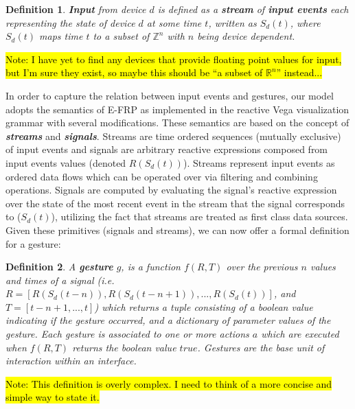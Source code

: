 \documentclass{article}
\newcommand{\Z}{\mathbb{Z}}
\newcommand{\R}{\mathbb{R}}
\newtheorem{define}{Definition}
\begin{document}
\begin{define}
\textbf{Input} from device $d$ is defined as a \textbf{stream} of \textbf{input events} each representing the state of device $d$ at some time $t$, written as $S_d(t)$, where $S_d(t)$ maps time $t$ to a subset of $\Z^n$ with $n$ being device dependent.
\end{define}

\hl{Note: I have yet to find any devices that provide floating point values for input, but I'm sure they exist, so maybe this should be ``a subset of $\R^n$'' instead...}

In order to capture the relation between input events and gestures, our model adopts the semantics of E-FRP as implemented in the reactive Vega visualization grammar \cite{satyanarayan2014declarative} with several modifications. These semantics are based on the concept of \textbf{\textit{streams}} and \textbf{\textit{signals}}. Streams are time ordered sequences (mutually exclusive) of input events and signals are arbitrary reactive expressions composed from input events values (denoted $R(S_d(t))$). Streams represent input events as ordered data flows which can be operated over via filtering and combining operations. Signals are computed by evaluating the signal's reactive expression over the state of the most recent event in the stream that the signal corresponds to ($S_d(t)$), utilizing the fact that streams are treated as first class data sources. Given these primitives (signals and streams), we can now offer a formal definition for a gesture:

\begin{define}
\label{def:gesture}
A \textbf{gesture} $g$, is a function $f(R, T)$ over the previous $n$ values and times of a signal (i.e. $R = [R(S_d(t-n)), R(S_d(t-n+1)), ..., R(S_d(t))]$, and $T = [t - n + 1, ... , t]$) which returns a tuple consisting of a boolean value indicating if the gesture occurred, and a dictionary of parameter values of the gesture. Each gesture is associated to one or more actions $a$ which are executed when $f(R,T)$ returns the boolean value $true$. Gestures are the base unit of interaction within an interface.
\end{define}

\hl{Note: This definition is overly complex. I need to think of a more concise and simple way to state it.}
\end{document}
